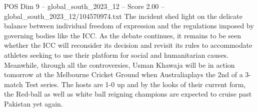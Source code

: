 \begin{textsample}{POS Dim 9 – global\_south\_2023\_12 – Score 2.00 – global\_south\_2023\_12/104570974.txt}
The incident shed light on the delicate balance between individual freedom of expression and the regulations imposed by governing bodies like the ICC.
As the debate continues, it remains to be seen whether the ICC will reconsider its decision and revisit its rules to accommodate athletes seeking to use their platform for social and humanitarian causes.
Meanwhile, through all the controversies, Usman Khawaja will be in action tomorrow at the Melbourne Cricket Ground when Australiaplays the 2nd of a 3-match Test series.
The hosts are 1-0 up and by the looks of their current form, the Red-ball as well as white ball reigning champions are expected to cruise past Pakistan yet again.

\end{textsample}
